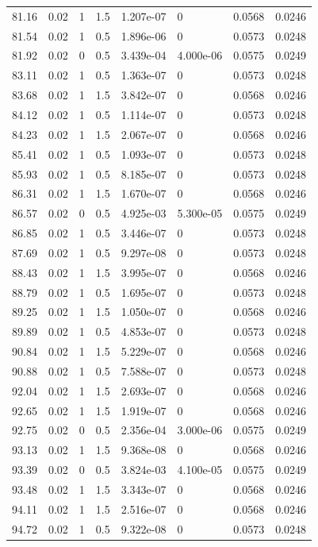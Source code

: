 \documentclass[preview]{standalone}
\begin{document}
{{{\begin{tabular}{L{1.2cm}C{1.2cm} C{0.3cm}C{0.5cm} C{1.4cm}C{1.4cm} C{1.4cm}C{1.4cm}}
  81.16  &  0.02  & 1     & 1.5 &  1.207e-07  & 0  & 0.0568 &  0.0246   \\ 
  81.54  &  0.02  & 1     & 0.5 &  1.896e-06  & 0  & 0.0573 &  0.0248   \\ 
  81.92  &  0.02  & 0     & 0.5 &  3.439e-04  & 4.000e-06  & 0.0575 &  0.0249   \\ 
  83.11  &  0.02  & 1     & 0.5 &  1.363e-07  & 0  & 0.0573 &  0.0248   \\ 
  83.68  &  0.02  & 1     & 1.5 &  3.842e-07  & 0  & 0.0568 &  0.0246   \\ 
  84.12  &  0.02  & 1     & 0.5 &  1.114e-07  & 0  & 0.0573 &  0.0248   \\ 
  84.23  &  0.02  & 1     & 1.5 &  2.067e-07  & 0  & 0.0568 &  0.0246   \\ 
  85.41  &  0.02  & 1     & 0.5 &  1.093e-07  & 0  & 0.0573 &  0.0248   \\ 
  85.93  &  0.02  & 1     & 0.5 &  8.185e-07  & 0  & 0.0573 &  0.0248   \\ 
  86.31  &  0.02  & 1     & 1.5 &  1.670e-07  & 0  & 0.0568 &  0.0246   \\ 
  86.57  &  0.02  & 0     & 0.5 &  4.925e-03  & 5.300e-05  & 0.0575 &  0.0249   \\ 
  86.85  &  0.02  & 1     & 0.5 &  3.446e-07  & 0  & 0.0573 &  0.0248   \\ 
  87.69  &  0.02  & 1     & 0.5 &  9.297e-08  & 0  & 0.0573 &  0.0248   \\ 
  88.43  &  0.02  & 1     & 1.5 &  3.995e-07  & 0  & 0.0568 &  0.0246   \\ 
  88.79  &  0.02  & 1     & 0.5 &  1.695e-07  & 0  & 0.0573 &  0.0248   \\ 
  89.25  &  0.02  & 1     & 1.5 &  1.050e-07  & 0  & 0.0568 &  0.0246   \\ 
  89.89  &  0.02  & 1     & 0.5 &  4.853e-07  & 0  & 0.0573 &  0.0248   \\ 
  90.84  &  0.02  & 1     & 1.5 &  5.229e-07  & 0  & 0.0568 &  0.0246   \\ 
  90.88  &  0.02  & 1     & 0.5 &  7.588e-07  & 0  & 0.0573 &  0.0248   \\ 
  92.04  &  0.02  & 1     & 1.5 &  2.693e-07  & 0  & 0.0568 &  0.0246   \\ 
  92.65  &  0.02  & 1     & 1.5 &  1.919e-07  & 0  & 0.0568 &  0.0246   \\ 
  92.75  &  0.02  & 0     & 0.5 &  2.356e-04  & 3.000e-06  & 0.0575 &  0.0249   \\ 
  93.13  &  0.02  & 1     & 1.5 &  9.368e-08  & 0  & 0.0568 &  0.0246   \\ 
  93.39  &  0.02  & 0     & 0.5 &  3.824e-03  & 4.100e-05  & 0.0575 &  0.0249   \\ 
  93.48  &  0.02  & 1     & 1.5 &  3.343e-07  & 0  & 0.0568 &  0.0246   \\ 
  94.11  &  0.02  & 1     & 1.5 &  2.516e-07  & 0  & 0.0568 &  0.0246   \\ 
  94.72  &  0.02  & 1     & 0.5 &  9.322e-08  & 0  & 0.0573 &  0.0248   \\ 
\hline 
\end{tabular} 

}}}
\end{document}
